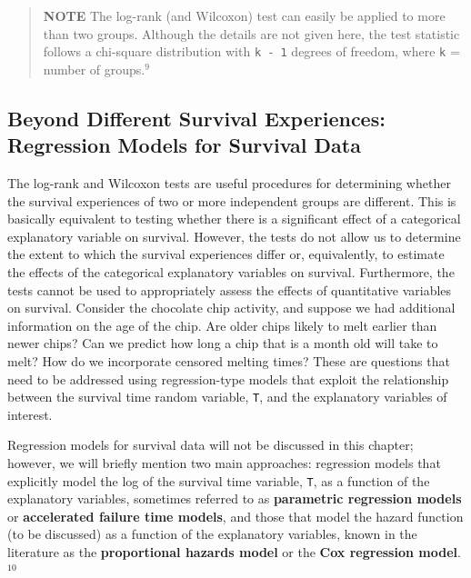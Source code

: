 \documentclass[
]{report}
\begin{document}
\begin{quote}
\textbf{NOTE}
The log-rank (and Wilcoxon) test can easily be applied to more than two groups. Although the details are not given here, the test statistic follows a chi-square distribution with \texttt{k\ -\ 1} degrees of freedom, where \texttt{k} = number of groups.\(^9\)
\end{quote}

\hypertarget{beyond-different-survival-experiences-regression-models-for-survival-data}{%
\subsection*{Beyond Different Survival Experiences: Regression Models for Survival Data}\label{beyond-different-survival-experiences-regression-models-for-survival-data}}

The log-rank and Wilcoxon tests are useful procedures for determining whether the survival experiences of two or more independent groups are different. This is basically equivalent to testing whether there is a significant effect of a categorical explanatory variable on survival. However, the tests do not allow us to determine the extent to which the survival experiences differ or, equivalently, to estimate the effects of the categorical explanatory variables on survival. Furthermore, the tests cannot be used to appropriately assess the effects of quantitative variables on survival. Consider the chocolate chip activity, and suppose we had additional information on the age of the chip. Are older chips likely to melt earlier than newer chips? Can we predict how long a chip that is a month old will take to melt? How do we incorporate censored melting times? These are questions that need to be addressed using regression-type models that exploit the relationship between the survival time random variable, \texttt{T}, and the explanatory variables of interest.

Regression models for survival data will not be discussed in this chapter; however, we will briefly mention two main approaches: regression models that explicitly model the log of the survival time variable, \texttt{T}, as a function of the explanatory variables, sometimes referred to as \textbf{parametric regression models} or \textbf{accelerated failure time models}, and those that model the hazard function (to be discussed) as a function of the explanatory variables, known in the literature as the \textbf{proportional hazards model} or the \textbf{Cox regression model}.\(^{10}\)
\end{document}
